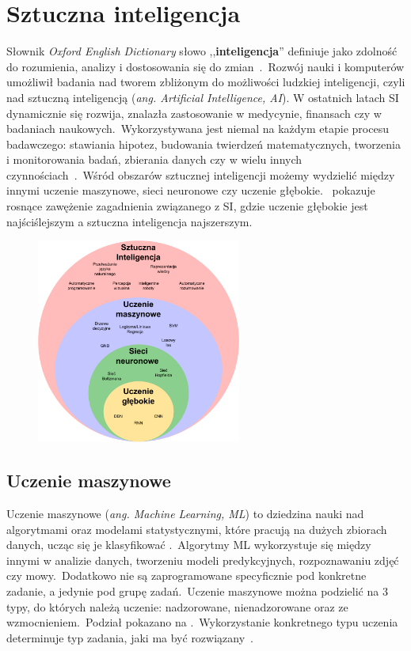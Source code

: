 \chapter{Sztuczna inteligencja}
Słownik \textit{Oxford English Dictionary} słowo ,,\textbf{inteligencja}'' definiuje jako zdolność do rozumienia, analizy i dostosowania się do zmian~\cite{OxfordJuly2023}.\ Rozwój nauki i komputerów umożliwił badania nad tworem zbliżonym do możliwości ludzkiej inteligencji, czyli nad sztuczną inteligencją (\textit{ang. Artificial Intelligence, AI}). W ostatnich latach SI dynamicznie się rozwija, znalazła zastosowanie w medycynie, finansach czy w badaniach naukowych.\ Wykorzystywana jest niemal na każdym etapie procesu badawczego: stawiania hipotez, budowania twierdzeń matematycznych, tworzenia i monitorowania badań, zbierania danych czy w wielu innych czynnościach~\cite{AiScience, Mahesh2018}.\ Wśród obszarów sztucznej inteligencji możemy wydzielić między innymi uczenie maszynowe, sieci neuronowe czy uczenie głębokie.\  pokazuje rosnące zawężenie zagadnienia związanego z SI, gdzie uczenie głębokie jest najściślejszym a sztuczna inteligencja najszerszym.

\begin{figure}[H]
    \centering
    \includegraphics[width=0.6\textwidth]{images/si}
    \label{fig:si-schema}
\end{figure}


\section{Uczenie maszynowe}
Uczenie maszynowe (\textit {ang. Machine Learning, ML}) to dziedzina nauki nad algorytmami oraz modelami statystycznymi, które pracują na dużych zbiorach danych, ucząc się je klasyfikować .\ Algorytmy ML wykorzystuje się między innymi w analizie danych, tworzeniu modeli predykcyjnych, rozpoznawaniu zdjęć czy mowy.\ Dodatkowo nie są zaprogramowane specyficznie pod konkretne zadanie, a jedynie pod grupę zadań.\ Uczenie maszynowe można podzielić na 3 typy, do których należą uczenie: nadzorowane, nienadzorowane oraz ze wzmocnieniem.\ Podział  pokazano na .\ Wykorzystanie konkretnego typu uczenia determinuje typ zadania, jaki ma być rozwiązany~\cite{Mahesh2018, LinkedInSi}.

